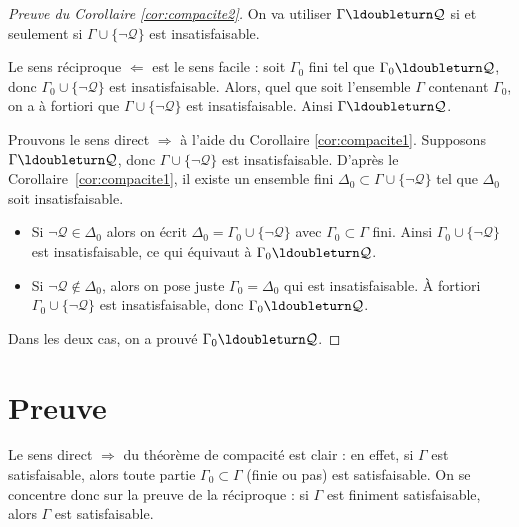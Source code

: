 \documentclass[11pt,class=report,crop=false]{standalone}
\begin{document}
\begin{proof}[Preuve du Corollaire \ref{cor:compacite2}]
On va utiliser \og{}$\Gamma \ldoubleturn \mathcal{Q}$ si et seulement si 
$\Gamma \cup \{ \lnot \mathcal{Q} \}$ est insatisfaisable\fg{}.

Le sens réciproque $\Leftarrow$ est le sens facile :
soit $\Gamma_0$ fini tel que $\Gamma_0 \ldoubleturn \mathcal{Q}$,
donc $\Gamma_0 \cup \{ \lnot \mathcal{Q} \}$ est insatisfaisable.
Alors, quel que soit l'ensemble $\Gamma$ contenant $\Gamma_0$, on a à fortiori que 
$\Gamma \cup \{ \lnot \mathcal{Q} \}$ est insatisfaisable. Ainsi $\Gamma \ldoubleturn \mathcal{Q}$.


Prouvons le sens direct $\Rightarrow$ à l'aide du Corollaire \ref{cor:compacite1}.
Supposons $\Gamma \ldoubleturn \mathcal{Q}$,
donc $\Gamma \cup \{ \lnot \mathcal{Q} \}$ est insatisfaisable.
D'après le Corollaire~\ref{cor:compacite1}, il existe un ensemble fini 
$\Delta_0 \subset \Gamma \cup \{ \lnot \mathcal{Q} \}$ tel que $\Delta_0$ soit insatisfaisable.
\begin{itemize}
	\item Si $\lnot \mathcal{Q} \in \Delta_0$ alors on écrit $\Delta_0 = \Gamma_0 \cup \{ \lnot \mathcal{Q} \}$ avec $\Gamma_0 \subset \Gamma$ fini. Ainsi $\Gamma_0 \cup \{ \lnot \mathcal{Q} \}$ est insatisfaisable, ce qui équivaut à 
	$\Gamma_0 \ldoubleturn \mathcal{Q}$.
	
	\item Si $\lnot \mathcal{Q} \notin \Delta_0$, alors on pose juste $\Gamma_0 = \Delta_0$ qui est insatisfaisable. À fortiori $\Gamma_0 \cup \{ \lnot \mathcal{Q} \}$ est insatisfaisable, donc 
	$\Gamma_0 \ldoubleturn \mathcal{Q}$.
\end{itemize}
Dans les deux cas, on a prouvé $\Gamma_0 \ldoubleturn \mathcal{Q}$.
\end{proof}



\section{Preuve}

Le sens direct $\Rightarrow$ du théorème de compacité est clair : en effet, si $\Gamma$ est satisfaisable, alors toute partie $\Gamma_0 \subset \Gamma$ (finie ou pas) est satisfaisable.
On se concentre donc sur la preuve de la réciproque : si $\Gamma$ est finiment satisfaisable, alors $\Gamma$ est satisfaisable.
\end{document}
